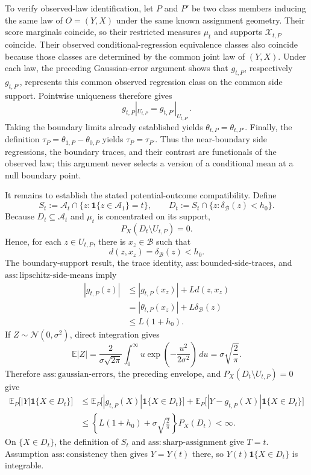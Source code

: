 To verify observed-law identification, let \(P\) and \(P'\) be two class members inducing the same law of \(O=(Y,X)\) under the same known assignment geometry.  Their score marginals coincide, so their restricted measures \(\mu_t\) and supports \(\mathcal X_{t,P}\) coincide.  Their observed conditional-regression equivalence classes also coincide because those classes are determined by the common joint law of \((Y,X)\).  Under each law, the preceding Gaussian-error argument shows that \(g_{t,P}\), respectively \(g_{t,P'}\), represents this common observed regression class on the common side support.  Pointwise uniqueness therefore gives
\[
g_{t,P}|_{U_{t,P}}=g_{t,P'}|_{U_{t,P'}}.
\]
Taking the boundary limits already established yields \(\theta_{t,P}=\theta_{t,P'}\).  Finally, the definition \(\tau_P=\theta_{1,P}-\theta_{0,P}\) yields \(\tau_P=\tau_{P'}\).  Thus the near-boundary side regressions, the boundary traces, and their contrast are functionals of the observed law; this argument never selects a version of a conditional mean at a null boundary point.

It remains to establish the stated potential-outcome compatibility.  Define
\[
S_t:=\mathcal A_t\cap\{z:\mathbf 1\{z\in\mathcal A_1\}=t\},
\qquad
D_t:=S_t\cap\{z:\delta_{\mathcal B}(z)<h_0\}.
\]
Because \(D_t\subseteq\mathcal A_t\) and \(\mu_t\) is concentrated on its support,
\[
P_X(D_t\setminus U_{t,P})=0.
\]
Hence, for each \(z\in U_{t,P}\), there is \(x_z\in\mathcal B\) such that
\[
d(z,x_z)=\delta_{\mathcal B}(z)<h_0.
\]
The boundary-support result, the trace identity, \(\mathrm{ass:bounded\text{-}side\text{-}traces}\), and \(\mathrm{ass:lipschitz\text{-}side\text{-}means}\) imply
\[
\begin{aligned}
|g_{t,P}(z)|
&\le |g_{t,P}(x_z)|+Ld(z,x_z)\\
&=|\theta_{t,P}(x_z)|+L\delta_{\mathcal B}(z)\\
&\le L(1+h_0).
\end{aligned}
\]
If \(Z\sim\mathcal N(0,\sigma^2)\), direct integration gives
\[
\mathbb E|Z|
=\frac{2}{\sigma\sqrt{2\pi}}\int_0^{\infty}u\exp\left(-\frac{u^2}{2\sigma^2}\right)\,du
=\sigma\sqrt{\frac{2}{\pi}}.
\]
Therefore \(\mathrm{ass:gaussian\text{-}errors}\), the preceding envelope, and \(P_X(D_t\setminus U_{t,P})=0\) give
\[
\begin{aligned}
\mathbb E_P\bigl[|Y|\mathbf 1\{X\in D_t\}\bigr]
&\le \mathbb E_P\bigl[|g_{t,P}(X)|\mathbf 1\{X\in D_t\}\bigr]
+\mathbb E_P\bigl[|Y-g_{t,P}(X)|\mathbf 1\{X\in D_t\}\bigr]\\
&\le \left\{L(1+h_0)+\sigma\sqrt{\frac{2}{\pi}}\right\}P_X(D_t)<\infty.
\end{aligned}
\]
On \(\{X\in D_t\}\), the definition of \(S_t\) and \(\mathrm{ass:sharp\text{-}assignment}\) give \(T=t\).  Assumption \(\mathrm{ass:consistency}\) then gives \(Y=Y(t)\) there, so \(Y(t)\mathbf 1\{X\in D_t\}\) is integrable.

